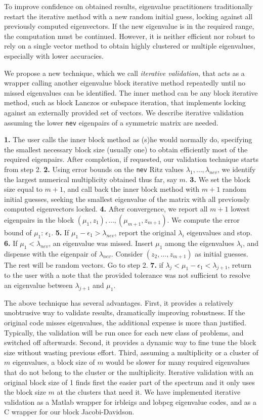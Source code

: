 \documentclass{report}
\begin{document}
To improve confidence on obtained results, eigenvalue practitioners
traditionally restart the iterative method with a new random initial guess,
locking against all previously computed eigenvectors.
If the new eigenvalue is in the required range, the computation
must be continued.
However, it is neither efficient nor robust to rely on a single
vector method to obtain highly clustered or multiple eigenvalues, especially
with lower accuracies.

We propose a new technique, which we call {\it iterative validation},
that acts as a wrapper calling another eigenvalue block iterative method
repeatedly until no missed eigenvalues can be identified.
The inner method can be any block iterative method, such as
block Lanczos or subspace iteration, that implements locking against
an externally provided set of vectors.
We describe iterative validation assuming the lower {\tt nev}
eigenpairs of a symmetric matrix are needed.

{\bf 1.}
The user calls the inner block method as (s)he would normally do,
specifying the smallest necessary block size (usually one) to obtain
efficiently most of the required eigenpairs.
After completion, if requested,
our validation technique starts from step 2.
{\bf 2.}
Using error bounds on the {\tt nev} Ritz values
$\lambda_1, \ldots , \lambda_{nev}$, we identify the largest
numerical multiplicity obtained thus far, say $m$.
{\bf 3.}
We set the block size equal to $m+1$, and call back the inner
block method with $m+1$ random initial guesses,
seeking the smallest eigenvalue of the matrix with
all previously computed eigenvectors locked.
{\bf 4.}
After convergence, we report all $m+1$ lowest eigenpairs in the block
$(\mu_1, z_1), \ldots , (\mu_{m+1}, z_{m+1})$.
We compute the error bound of $\mu_1$: $\epsilon_1$.
{\bf 5.}
If $\mu_1 - \epsilon_1 > \lambda_{nev}$, report the original $\lambda_i$
eigenvalues and stop.
{\bf 6.}
If $\mu_1 < \lambda_{nev}$, an eigenvalue was missed.
Insert $\mu_1$ among the eigenvalues $\lambda_i$,
and dispense with the eigenpair of $\lambda_{nev}$.
Consider $(z_2, \ldots , z_{m+1})$ as initial guesses. The rest
will be random vectors.
Go to step 2.
{\bf 7.}
if $\lambda_j < \mu_1 - \epsilon_1 < \lambda_{j+1}$, return to the
user with a note that the provided tolerance
was not sufficient to resolve an eigenvalue between $\lambda_{j+1}$
and $\mu_1$.

The above technique has several advantages.
First, it provides a relatively unobtrusive way to
validate results, dramatically improving robustness.
If the original code misses eigenvalues,
the additional expense is more than justified.
Typically, the validation will be run once for each new class of
problems, and switched off afterwards.
Second, it provides a dynamic way to fine tune the block size without
wasting previous effort.
Third, assuming a multiplicity or a cluster of $m$ eigenvalues,
a block size of $m$ would be slower for many
required eigenvalues that do not belong to the cluster or
the multiplicity.
Iterative validation with an original block size of 1 finds first
the easier part of the spectrum and it only uses the block size
$m$ at the clusters that need it.
We have implemented iterative validation as a Matlab wrapper for
\mbox{irbleigs} and \mbox{lobpcg} eigenvalue codes, and as a C
wrapper for our block Jacobi-Davidson.
\end{document}
